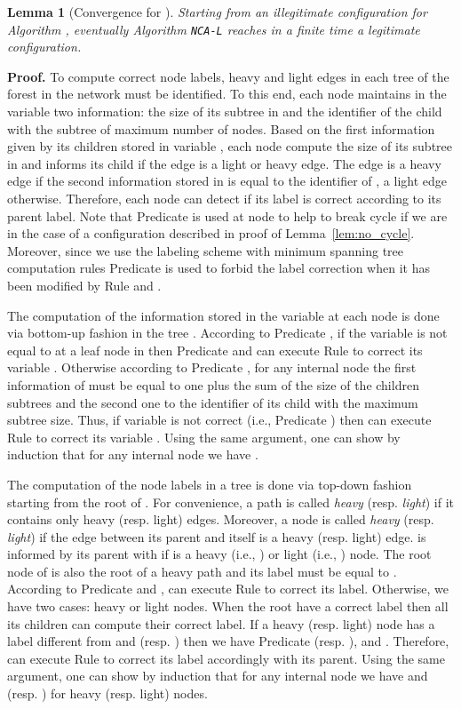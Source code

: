 \documentclass[11pt,a4paper]{article}
\newtheorem{lemma}{Lemma}
\newenvironment{proof}{\noindent \begin{rm}{\textbf{Proof.} }}{\hspace*{\fill}\par\end{rm}}
\newcommand{\LabA}{\mbox{\tt NCA-L}}
\begin{document}
\begin{lemma}[Convergence for ]
\label{lem:label_convergence}
Starting from an illegitimate configuration for Algorithm , eventually Algorithm \LabA\/ reaches in a finite time a legitimate configuration.
\end{lemma}

\begin{proof}
To compute correct node labels, heavy and light edges in each tree  of the forest in the network must be identified. To this end, each node  maintains in the variable  two information: the size of its subtree in  and the identifier of the child with the subtree of maximum number of nodes. Based on the first information given by its children  stored in variable , each node  compute the size of its subtree in  and informs its child  if the edge  is a light or heavy edge. The edge  is a heavy edge if the second information stored in  is equal to  the identifier of , a light edge otherwise. Therefore, each node  can detect if its label is correct according to its parent label. Note that Predicate  is used at node  to help to break cycle if we are in the case of a configuration described in proof of Lemma~\ref{lem:no_cycle}. Moreover, since we use the labeling scheme with minimum spanning tree computation rules Predicate  is used to forbid the label correction when it has been modified by Rule  and .

The computation of the information stored in the variable  at each node  is done via bottom-up fashion in the tree . According to Predicate , if the variable  is not equal to  at a leaf node  in  then Predicate  and  can execute Rule  to correct its variable . Otherwise according to Predicate , for any internal node  the first information of  must be equal to one plus the sum of the size of the children subtrees and the second one to the identifier of its child with the maximum subtree size. Thus, if variable  is not correct (i.e., Predicate ) then  can execute Rule  to correct its variable . Using the same argument, one can show by induction that for any internal node  we have .

The computation of the node labels in a tree  is done via top-down fashion starting from the root of . For convenience, a path is called \emph{heavy} (resp. \emph{light}) if it contains only heavy (resp. light) edges. Moreover, a node is called \emph{heavy} (resp. \emph{light}) if the edge between its parent and itself is a heavy (resp. light) edge.  is informed by its parent with  if  is a heavy (i.e., ) or light (i.e., ) node. The root node  of  is also the root of a heavy path and its label must be equal to . According to Predicate  and ,  can execute Rule  to correct its label. Otherwise, we have two cases: heavy or light nodes. When the root have a correct label then all its children can compute their correct label. If a heavy (resp. light) node has a label different from  and  (resp. ) then we have Predicate  (resp. ),  and . Therefore,  can execute Rule  to correct its label  accordingly with its parent. Using the same argument, one can show by induction that for any internal node  we have  and  (resp. ) for heavy (resp. light) nodes.
\end{proof}
\end{document}
